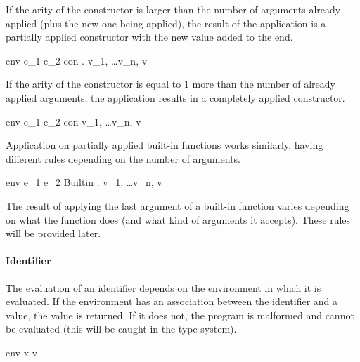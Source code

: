 \documentclass{article}
\begin{document}
If the arity of the constructor is larger than the number of arguments already applied (plus the new one being applied), the result of the application is a partially applied constructor with the new value added to the end.

    {\mbox{env} \vdash e_1 \; e_2 \Downarrow \ll con \; . \; v_1, \; \dots v_n, \; v \gg}

If the arity of the constructor is equal to 1 more than the number of already applied arguments, the application results in a completely applied constructor.

    {\mbox{env} \vdash e_1 \; e_2 \Downarrow con \; v_1, \; \dots v_n, \; v}

\medskip

Application on partially applied built-in functions works similarly, having different rules depending on the number of arguments.

    {\mbox{env} \vdash e_1 \; e_2 \Downarrow \ll Builtin \; . \; v_1, \; \dots v_n, \; v \gg}

The result of applying the last argument of a built-in function varies depending on what the function does (and what kind of arguments it accepts).
These rules will be provided later.

\paragraph{Identifier}

The evaluation of an identifier depends on the environment in which it is evaluated.
If the environment has an association between the identifier and a value, the value is returned.
If it does not, the program is malformed and cannot be evaluated (this will be caught in the type system).

    {\mbox{env} \vdash x \Downarrow v}
\end{document}
